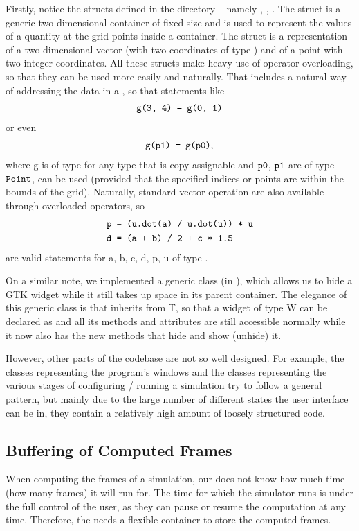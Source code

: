 \documentclass[11pt,a4paper,twoside,openright]{report}
\begin{document}
Firstly, notice the structs defined in the  directory -- namely , , . The  struct is a generic two-dimensional container of fixed size and is used to represent the values of a quantity at the grid points inside a container. The  struct is a representation of a two-dimensional vector (with two coordinates of type ) and  of a point with two integer coordinates. All these structs make heavy use of operator overloading, so that they can be used more easily and naturally. That includes a natural way of addressing the data in a , so that statements like
\begin{align*}
	\texttt{g(3, 4) = g(0, 1)}
\end{align*}
or even
\begin{align*}
	\texttt{g(p1) = g(p0)},
\end{align*}
where \icd g is of type  for any type  that is copy assignable and $\texttt{p0}$, $\texttt{p1}$ are of type $\texttt{Point}$, can be used (provided that the specified indices or points are within the bounds of the grid). Naturally, standard vector operation are also available through overloaded operators, so
\begin{align*}
	&\texttt{p = (u.dot(a) / u.dot(u)) * u}\\
	&\texttt{d = (a + b) / 2 + c * 1.5}
\end{align*}
are valid statements for \icd a, \icd b, \icd c, \icd d, \icd p, \icd u of type .

On a similar note, we implemented a generic class  (in ), which allows us to hide a GTK widget while it still takes up space in its parent container. The elegance of this generic class is that  inherits from \icd T, so that a widget of type \icd W can be declared as  and all its methods and attributes are still accessible normally while it now also has the new methods that hide and show (unhide) it.

However, other parts of the codebase are not so well designed. For example, the classes representing the program's windows and the classes representing the various stages of configuring / running a simulation try to follow a general pattern, but mainly due to the large number of different states the user interface can be in, they contain a relatively high amount of loosely structured code.

\subsection{Buffering of Computed Frames}
When computing the frames of a simulation, our \software{} does not know how much time (how many frames) it will run for. The time for which the simulator runs is under the full control of the user, as they can pause or resume the computation at any time. Therefore, the \software{} needs a flexible container to store the computed frames.
\end{document}
